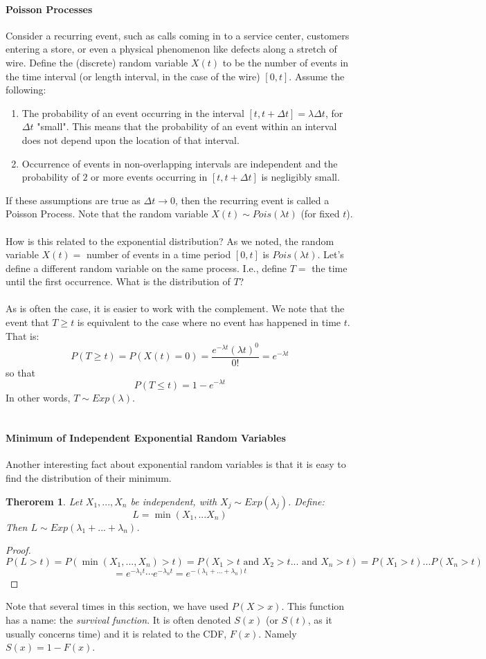 \documentclass[12pt]{article} %
\newtheorem{thm}{Therorem}
\begin{document}
\paragraph{Poisson Processes}
Consider a recurring event, such as calls coming in to a service center, customers entering a store, or even a physical phenomenon like defects along a stretch of wire. Define the (discrete) random variable $X(t)$ to be the number of events in the time interval (or length interval, in the case of the wire) $[0,t]$. Assume the following:
\begin{enumerate}
\item The probability of an event occurring in the interval $[t,t+\Delta t] = \lambda \Delta t$, for $\Delta t$ "small". This means that the probability of an event within an interval does not depend upon the location of that interval. 
\item Occurrence of events in non-overlapping intervals are independent and the probability of $2$ or more events occurring in $[t,t+\Delta t]$ is negligibly small.
\end{enumerate} 
If these assumptions are true as $\Delta t \rightarrow 0$, then the recurring event is called a Poisson Process. Note that the random variable $X(t) \sim Pois(\lambda t)$ (for fixed $t$).\\\\
How is this related to the exponential distribution? As we noted, the random variable $X(t) = $ number of events in a time period $[0,t]$ is $Pois(\lambda t)$. Let's define a different random variable on the same process. I.e., define $T =$ the time until the first occurrence. What is the distribution of $T$?\\\\
As is often the case, it is easier to work with the complement. We note that the event that $T\geq t$ is equivalent to the case where no event has happened in time $t$. That is:
$$P(T\geq t) = P(X(t) = 0) = \frac{e^{-\lambda t} \left(\lambda t\right)^0}{0!} = e^{-\lambda t}$$
so that
$$P(T\leq t) = 1 - e^{-\lambda t}$$
In other words, $T \sim Exp(\lambda)$.\\\\
\paragraph{Minimum of Independent Exponential Random Variables}
Another interesting fact about exponential random variables is that it is easy to find the distribution of their minimum.
\begin{thm}
Let $X_1,...,X_n$ be independent, with $X_j\sim Exp(\lambda_j)$. Define:$$L = \min(X_1,...X_n)$$
Then $L\sim Exp(\lambda_1+...+\lambda_n)$.
\end{thm}
\begin{proof}
$$P(L>t) = P(\min(X_1,...,X_n)>t) = P(X_1>t \textrm{ and } X_2>t ... \textrm{ and } X_n>t) = P(X_1>t)...P(X_n>t)$$
$$ = e^{-\lambda_1 t}\cdots e^{-\lambda_n t} = e^{-(\lambda_1+...+\lambda_n)t}$$
\end{proof}
Note that several times in this section, we have used $P(X>x)$. This function has a name: the \emph{survival function}. It is often denoted $S(x)$ (or $S(t)$, as it usually concerns time) and it is related to the CDF, $F(x)$. Namely $S(x) = 1-F(x)$. 
\end{document}

